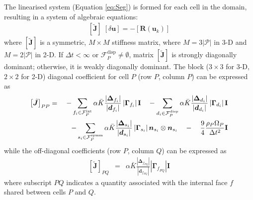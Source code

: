 \documentclass[sn-mathphys,Numbered]{sn-jnl}%
\newcommand{\bb}{\boldsymbol}
\begin{document}
The linearised system (Equation \ref{eq:Seg}) is formed for each cell in the domain, resulting in a system of algebraic equations:
\begin{eqnarray} \label{eq:SegSys}
    \left[ \bb{\tilde{J}} \right]  \; \left[ \delta \bb{u} \right] = - \left[\bb{R}(\bb{u}_k)\right]
\end{eqnarray}
where $\left[ \bb{\tilde{J}} \right]$ is a symmetric, $M \times M$ stiffness matrix, where $M = 3|\mathcal{P}|$ in 3-D and $M = 2|\mathcal{P}|$ in 2-D.
If $\Delta t < \infty$ or $\mathcal{F}^{\text{disp}}_P \neq \emptyset$, matrix $\left[ \bb{\tilde{J}} \right]$ is strongly diagonally dominant; otherwise, it is weakly diagonally dominant.
The block ($3\times3$ for 3-D, $2\times2$ for 2-D) diagonal coefficient for cell $P$ (row $P$, column $P$) can be expressed as
\begin{eqnarray}
	 \left[ \tilde{\bb{J}}\right]_{PP} &=&
		- \sum_{f_i \in \mathcal{F}^{\text{int}}_P}  \alpha \bar{K}
		\frac{ \left|\bb{\Delta}_{f_i} \right| }{\left|\bb{d}_{f_i}\right|}    \left|\bb{\Gamma}_{f_i}\right| \textbf{I} 
	    \quad-  \sum_{d_i \in \mathcal{F}^{\text{disp}}_P}  \alpha \bar{K}
		 \frac{ \left|\bb{\Delta}_{d_i} \right| }{\left|\bb{d}_{d_i}\right|} 
		\left|\bb{\Gamma}_{d_i}\right| \textbf{I} \notag \\
	 &&\quad - \sum_{s_i \in \mathcal{F}^{\text{symm}}_P} \alpha \bar{K}
		 \frac{ \left|\bb{\Delta}_{s_i} \right|}{\left|\bb{d}_{s_i}\right|}
		\left|\bb{\Gamma}_{s_i}\right|  \bb{n}_{s_i} \otimes \bb{n}_{s_i} 
	\quad - \quad \frac{9}{4}  \frac{\rho_P \Omega_P}{\Delta t^2} \textbf{I}
\end{eqnarray}
while the off-diagonal coefficients (row $P$, column $Q$) can be expressed as
\begin{eqnarray}
	\left[\tilde{\bb{J}}\right] _{PQ} &=&
		\alpha \bar{K} \frac{ \left|\bb{\Delta}_{f_{PQ}} \right| }{\left|\bb{d}_{f_{PQ}}\right|} \left|\bb{\Gamma}_{f_{PQ}}\right| \textbf{I} 
\end{eqnarray}
where subscript $PQ$ indicates a quantity associated with the internal face $f$ shared between cells $P$ and $Q$.
\end{document}

